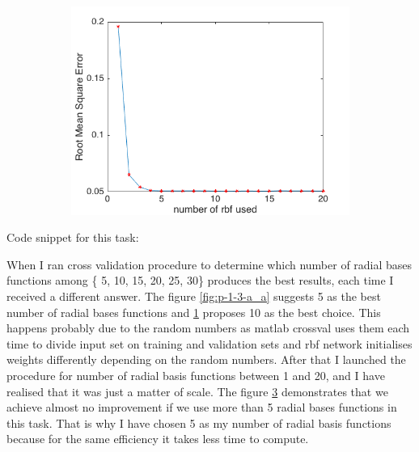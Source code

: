 \documentclass{article}
\begin{document}
\begin{enumerate}[label=(\alph*)]
\begin{figure}[t]
\begin{subfigure}{0.5\textwidth}
				 			\caption{}
				 			\label{fig:p-1-3-a_b}
				 		\end{subfigure}\\
				 		\begin{subfigure}{0.5\textwidth}
				 			\includegraphics[width=\linewidth]{images/p1-3-a_1_20.png}
				 			\caption{}
				 			\label{fig:p-1-3-a_c}
				 		\end{subfigure}

				 	\end{figure}	
				 	Code snippet for this task:
				 	
				 	When I ran cross validation procedure to determine which number of radial bases functions among \{ 5, 10, 15, 20, 25, 30\}  produces the best results, each time I received a different answer.  The figure \ref{fig:p-1-3-a_a} suggests 5 as the best number of radial bases functions and \ref{fig:p-1-3-a_b} proposes 10 as the best choice. This happens probably due to the random numbers as matlab crossval uses them each time to divide input set on training and validation sets and rbf network initialises weights differently depending on the random numbers. After that I launched the procedure for number of radial basis functions between 1 and 20, and I have realised that it was just a matter of scale. The figure \ref{fig:p-1-3-a_c} demonstrates that we achieve almost no improvement if we use more than 5 radial bases functions in this task. That is why I have chosen 5 as my number of radial basis functions because for the same efficiency it takes less time to compute.
				 	

\end{enumerate}
\end{document}
